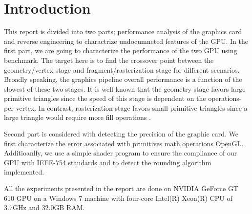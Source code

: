 \section{Introduction}
This report is divided into two parts; performance analysis of the graphics card and reverse engineering to charactrize undocumneted features of the GPU. In the first part, we are going to characterize the performance of the two GPU using \protect{\wes} benchmark. The target here is to find the crossover point between the geometry/vertex stage and fragment/rasterization stage for different scenarios. Broadly speaking, the graphics pipeline overall performance is a function of the slowest of these two stages. It is well known that the geometry stage favors large primitive triangles since the speed of this stage is dependent on the operations-per-vertex. In contrast, rasterization stage favors small primitive triangles since a large triangle would require more fill operations \cite{Bethel_2010}.

Second part is considered with detecting the precision of the graphic card. We first characterize the error associated with primitives math operations OpenGL. Additioanlly, we use a simple shader program to ensure the compliance of our GPU with IEEE-754 standards and to detect the rounding algorithm implemented. 

All the experiments presented in the report are done on NVIDIA GeForce GT 610 GPU on a Windows 7 machine with four-core Intel(R) Xeon(R) CPU of 3.7GHz and 32.0GB RAM. 

